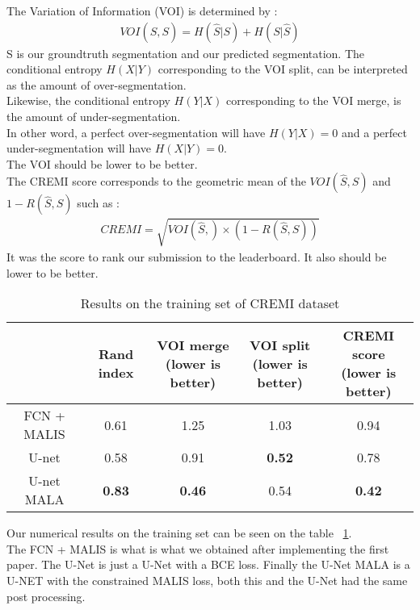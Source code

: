 The Variation of Information (VOI) is determined by :\\
\begin{gather*}
	VOI(\hat{S},S) = H(\hat{S}|S) + H(S|\hat{S})
\end{gather*}
S is our groundtruth segmentation and  our predicted segmentation.
The conditional entropy $H(X|Y)$ corresponding to the VOI split, can be interpreted as the amount of over-segmentation.\\
Likewise, the conditional entropy $H(Y|X)$ corresponding to the VOI merge, is the amount of under-segmentation.\\
In other word, a perfect over-segmentation will have $H(Y|X) = 0$ and a perfect under-segmentation will have $H(X|Y) = 0$.\\
The VOI should be lower to be better.\\

The CREMI score corresponds to the geometric mean of the $VOI(\hat{S},S)$ and $1-R(\hat{S},S)$ such as :\\
\begin{gather*}
	CREMI = \sqrt{VOI(\hat{S},)\times (1 - R(\hat{S},S))}
\end{gather*}
It was the score to rank our submission to the leaderboard. It also should be lower to be better.\\

\begin{table}[!htbp]
	\centering
	\begin{tabular}{|c|c|c|c|c|}
		\hline
		& Rand index & \thead{VOI merge \\(lower is better)} & \thead{VOI split\\(lower is better)} & \thead{CREMI score\\(lower is better)}\\
		\hline
		FCN + MALIS & 0.61 & 1.25 & 1.03 & 0.94\\
		\hline
		U-net & 0.58 & 0.91 & \textbf{0.52} & 0.78\\
		\hline
		U-net MALA & \textbf{0.83} & \textbf{0.46} & 0.54 & \textbf{0.42}\\
		\hline
	\end{tabular}
	\caption{Results on the training set of CREMI dataset}
\label{tab:cremi_res_train}
\end{table}

Our numerical results on the training set can be seen on the table ~\ref{tab:cremi_res_train}.\\
The FCN + MALIS is what is what we obtained after implementing the first paper.
The U-Net is just a U-Net with a BCE loss.
Finally the U-Net MALA is a U-NET with the constrained MALIS loss, both this and the U-Net had the same post processing.\\

